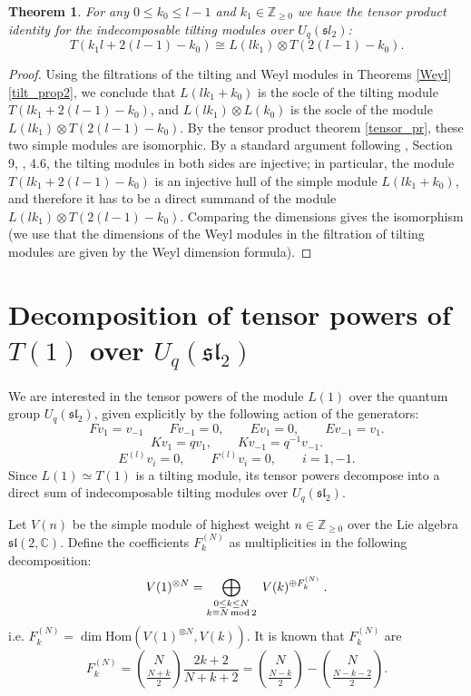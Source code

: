 \documentclass[11pt]{amsart}
\newcommand\lie[1]{\mathfrak{#1}}
\newcommand{\CC}{\mathbb{C}}
\newtheorem{theorem}{Theorem}[section]
\begin{document}
\begin{theorem} \label{tilt_prod}
For any $0 \leq k_0 \leq l-1$ and $k_1 \in \mathbb{Z}_{\geq 0}$ we have the tensor product identity for the indecomposable 
tilting modules over $U_q({\lie sl}_2)$: 
\[ T(k_1 l + 2(l-1) - k_0) \cong L(lk_1)  \otimes T(2(l-1) -k_0) .\] 
\end{theorem} 
\begin{proof} 
Using the filtrations of the tilting and Weyl modules in Theorems \ref{Weyl} \ref{tilt_prop2}, we conclude that $L(lk_1 +k_0)$ is the socle of the tilting module $T(lk_1 + 2(l-1) -k_0)$, and $L(lk_1) \otimes L(k_0)$ is the socle of the module 
$L(lk_1) \otimes T(2(l-1) - k_0)$. By the tensor product theorem \ref{tensor_pr}, these two simple modules are isomorphic. 
By a standard argument following \cite{APW1}, Section 9, \cite{APW2}, 4.6,  the tilting modules in both sides are injective; in particular, the module $T(l k_1+ 2(l-1) -k_0)$ is an injective hull of the simple module $L(lk_1 + k_0)$, and therefore it has to be a direct summand of the module  $L(lk_1) \otimes T(2(l-1) - k_0)$. Comparing the dimensions gives the isomorphism (we use that the dimensions of the Weyl modules in the filtration of tilting modules are given by the Weyl dimension formula). 
\end{proof} 



\section{Decomposition of tensor powers of $T(1)$ over $U_q(\lie{sl}_2)$} \label{tp}
We are interested in the tensor powers of the module $L(1)$ over the quantum group $U_q(\lie{sl}_2)$, given explicitly by the following action of the generators: 
\[ F v_1  = v_{-1} \quad \quad F v_{-1} =0 , \quad \quad Ev_1= 0, \quad \quad Ev_{-1} =   v_1 .\] 
\[ Kv_1 =  q v_1, \quad \quad  Kv_{-1} = q^{-1} v_{-1} .\] 
\[ E^{(l)} v_i =0, \quad \quad F^{(l)} v_i =0, \quad \quad i=1, -1 .\] 
Since $L(1) \simeq T(1)$ is a tilting module, its tensor powers decompose into a direct sum of indecomposable tilting modules over $U_q(\lie{sl}_2)$. 


Let $V(n)$ be the simple module of highest weight $n \in \mathbb{Z}_{\geq 0}$ over the Lie algebra $\lie{sl}(2, \CC)$.  Define the coefficients $F_k^{(N)}$ as multiplicities in the following decomposition: 
\begin{equation} \label{sl2} 
 V(1)^{\otimes N} = \bigoplus_{\substack{0 \leq k \leq N\\ k \equiv N\,{\rm mod}\,{2}}}  \; V(k)^{\oplus F_k^{(N)}}  \; . 
 \end{equation} 
i.e. $F_k^{(N)}=\dim\mathrm{Hom}(V(1)^{\otimes N}, V(k))$. It is known that  $F_k^{(N)}$ are 
\begin{equation} \label{tkN} 
F_k^{(N)} = {N\choose{\frac{N+k}{2}}} \frac{2k+2}{N+k+2}= {N\choose{\frac{N-k}{2}}}-{N\choose{\frac{N-k-2}{2}}} .
\end{equation} 
\end{document}
